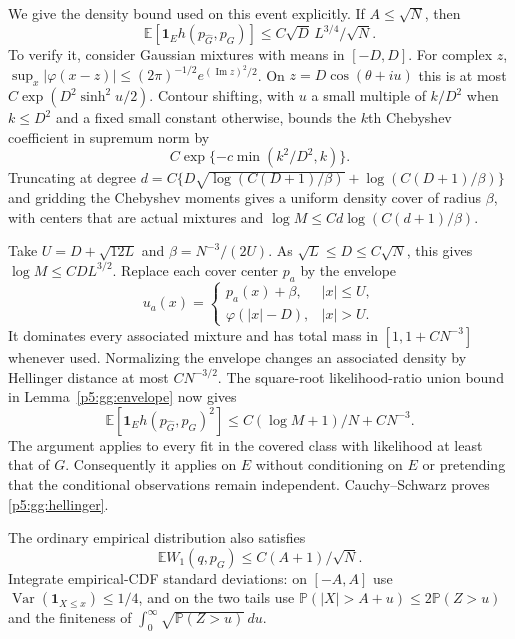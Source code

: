 \documentclass[11pt,a4paper]{article}
\theoremstyle{definition}
\theoremstyle{remark}
\numberwithin{equation}{section}
\begin{document}
We give the density bound used on this event explicitly.  If
$A\le\sqrt N$, then
\begin{equation}\label{p5:gg:hellinger}
 \mathbb E[\mathbf1_E h(p_{\widehat G},p_G)]
                         \le C\sqrt D\,L^{3/4}/\sqrt N.
\end{equation}
To verify it, consider Gaussian mixtures with means in $[-D,D]$.
For complex $z$, $\sup_x|\varphi(x-z)|
\le(2\pi)^{-1/2}e^{(\operatorname{Im}z)^2/2}$.
On $z=D\cos(\theta+iu)$ this is at most
$C\exp(D^2\sinh^2u/2)$.  Contour shifting, with
$u$ a small multiple of $k/D^2$ when $k\le D^2$ and a fixed
small constant otherwise, bounds the $k$th Chebyshev coefficient
in supremum norm by
\[
                     C\exp\{-c\min(k^2/D^2,k)\}.
\]
Truncating at degree
$d=C\{D\sqrt{\log(C(D+1)/\beta)}+
\log(C(D+1)/\beta)\}$ and gridding the Chebyshev moments gives
a uniform density cover of radius $\beta$, with centers that are
actual mixtures and $\log M\le Cd\log(C(d+1)/\beta)$.

Take $U=D+\sqrt{12L}$ and $\beta=N^{-3}/(2U)$.
As $\sqrt L\le D\le C\sqrt N$, this gives
$\log M\le CD L^{3/2}$.  Replace each cover center $p_a$ by
the envelope
\[
 u_a(x)=\begin{cases}p_a(x)+\beta,&|x|\le U,\\
                      \varphi(|x|-D),&|x|>U.
        \end{cases}
\]
It dominates every associated mixture and has total mass in
$[1,1+CN^{-3}]$ whenever used.  Normalizing the envelope changes
an associated density by Hellinger distance at most $CN^{-3/2}$.
The square-root likelihood-ratio union bound in
Lemma~\ref{p5:gg:envelope} now gives
\[
 \mathbb E[\mathbf1_E h(p_{\widehat G},p_G)^2]
                     \le C(\log M+1)/N+CN^{-3}.
\]
The argument applies to every fit in the covered class with
likelihood at least that of $G$.  Consequently it applies on $E$
without conditioning on $E$ or pretending that the conditional
observations remain independent.  Cauchy--Schwarz proves
\eqref{p5:gg:hellinger}.

The ordinary empirical distribution also satisfies
\begin{equation}\label{p5:gg:empirical}
                 \mathbb E W_1(q,p_G)\le C(A+1)/\sqrt N.
\end{equation}
Integrate empirical-CDF standard deviations: on $[-A,A]$ use
$\operatorname{Var}(\mathbf1_{X\le x})\le1/4$, and on the two
tails use $\mathbb P(|X|>A+u)\le2\mathbb P(Z>u)$ and the
finiteness of $\int_0^\infty\sqrt{\mathbb P(Z>u)}\,du$.
\end{document}
